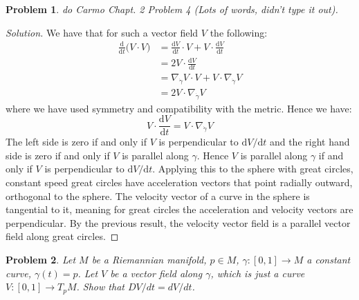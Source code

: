 \documentclass{article}
\theoremstyle{normal}
\newtheorem{problem}{Problem}
\begin{document}
    \begin{problem}
        do Carmo Chapt. 2 Problem 4 (Lots of words, didn't type it out).
    \end{problem}
    \begin{proof}[Solution]
        We have that for such a vector field $V$ the following:
        \begin{align}
            \frac{\textrm{d}}{\textrm{d}t}\Big(V\cdot{V}\Big)
            &=\frac{\textrm{d}V}{\textrm{d}t}\cdot{V}+
                V\cdot\frac{\textrm{d}V}{\textrm{d}t}\\
            &=2V\cdot\frac{\textrm{d}V}{\textrm{d}t}\\
            &=\nabla_{\dot{\gamma}}V\cdot{V}+
                V\cdot\nabla_{\dot{\gamma}}V\\
            &=2V\cdot\nabla_{\dot{\gamma}}V
        \end{align}
        where we have used symmetry and compatibility with the metric.
        Hence we have:
        \begin{equation}
            V\cdot\frac{\textrm{d}V}{\textrm{d}t}=
            V\cdot\nabla_{\dot{\gamma}}V
        \end{equation}
        The left side is zero if and only if $V$ is perpendicular to
        $\textrm{d}V/\textrm{d}t$ and the right hand side is zero if and only
        if $V$ is parallel along $\gamma$. Hence $V$ is parallel along $\gamma$
        if and only if $V$ is perpendicular to $\textrm{d}V/\textrm{d}t$.
        Applying this to the sphere with great circles, constant speed great
        circles have acceleration vectors that point radially outward,
        orthogonal to the sphere. The velocity vector of a curve in the sphere
        is tangential to it, meaning for great circles the acceleration and
        velocity vectors are perpendicular. By the previous result, the
        velocity vector field is a parallel vector field along great circles.
    \end{proof}
    \begin{problem}
        Let $M$ be a Riemannian manifold, $p\in{M}$, $\gamma:[0,1]\rightarrow{M}$
        a constant curve, $\gamma(t)=p$. Let $V$ be a vector field along
        $\gamma$, which is just a curve $V:[0,1]\rightarrow{T}_{p}M$. Show that
        $DV/dt=dV/dt$.
    \end{problem}
\end{document}
